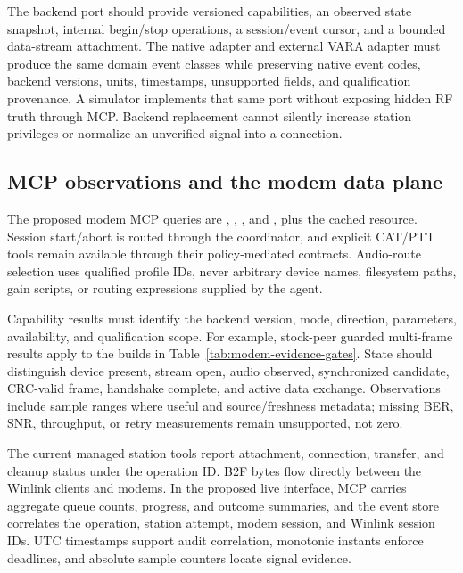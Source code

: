 
The backend port should provide versioned capabilities, an observed state
snapshot, internal begin/stop operations, a session/event cursor, and a bounded
data-stream attachment. The native adapter and external VARA adapter must
produce the same domain event classes while preserving native event codes,
backend versions, units, timestamps, unsupported fields, and qualification
provenance. A simulator implements that same port without exposing hidden RF
truth through MCP. Backend replacement cannot silently increase station
privileges or normalize an unverified signal into a connection.

\subsection{MCP observations and the modem data plane}
The proposed modem MCP queries are
, ,
, and , plus the cached
 resource. Session start/abort is routed through
the coordinator, and explicit CAT/PTT tools remain available through their
policy-mediated contracts. Audio-route selection uses qualified profile IDs,
never arbitrary device names, filesystem paths, gain scripts, or routing
expressions supplied by the agent.

Capability results must identify the backend version, mode, direction,
parameters, availability, and qualification scope. For example, stock-peer
guarded multi-frame results apply to the builds in
Table~\ref{tab:modem-evidence-gates}. State should distinguish device present, stream open,
audio observed, synchronized candidate, CRC-valid frame, handshake complete,
and active data exchange. Observations include sample ranges where useful and
source/freshness metadata; missing BER, SNR, throughput, or retry measurements
remain unsupported, not zero.

The current managed station tools report attachment, connection, transfer,
and cleanup status under the operation ID. B2F bytes flow directly between
the Winlink clients and modems. In the proposed live interface, MCP carries
aggregate queue counts, progress, and outcome summaries, and the event
store correlates the operation, station attempt, modem session, and Winlink
session IDs. UTC timestamps support audit correlation, monotonic instants
enforce deadlines, and absolute sample counters locate signal evidence.

